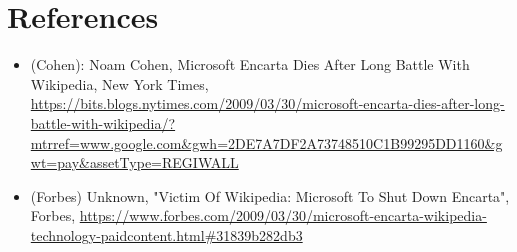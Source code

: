 \section*{References}

\begin{itemize}

\item (Cohen): Noam Cohen, Microsoft Encarta Dies After Long Battle With Wikipedia, New York Times, \url{https://bits.blogs.nytimes.com/2009/03/30/microsoft-encarta-dies-after-long-battle-with-wikipedia/?mtrref=www.google.com&gwh=2DE7A7DF2A73748510C1B99295DD1160&gwt=pay&assetType=REGIWALL}

\item (Forbes) Unknown, "Victim Of Wikipedia: Microsoft To Shut Down Encarta", Forbes, \url{https://www.forbes.com/2009/03/30/microsoft-encarta-wikipedia-technology-paidcontent.html#31839b282db3}

\end{itemize}
